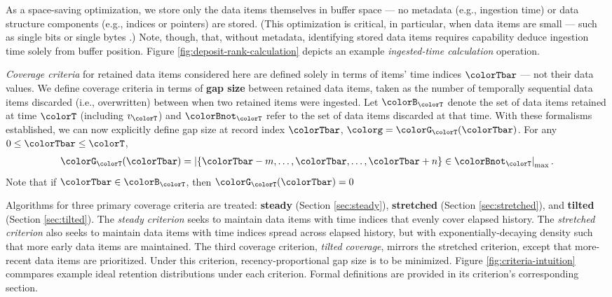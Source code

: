 As a space-saving optimization, we store only the data items themselves in buffer space --- no metadata (e.g., ingestion time) or data structure components (e.g., indices or pointers) are stored.
(This optimization is critical, in particular, when data items are small --- such as single bits or single bytes \citep{moreno2022hereditary}.)
Note, though, that, without metadata, identifying stored data items requires capability deduce ingestion time solely from buffer position.
Figure \ref{fig:deposit-rank-calculation} depicts an example \textit{ingested-time calculation} operation.

\textit{Coverage criteria} for retained data items considered here are defined solely in terms of items' time indices $\colorTbar$ --- not their data values.
We define coverage criteria in terms of \textbf{gap size} between retained data items, taken as the number of temporally sequential data items discarded (i.e., overwritten) between when two retained items were ingested.
Let $\colorB_{\colorT}$ denote the set of data items retained at time $\colorT$ (including $v_{\colorT}$) and $\colorBnot_{\colorT}$ refer to the set of data items discarded at that time.
With these formalisms established, we can now explicitly define gap size at record index $\colorTbar$, $\colorg = \colorG_{\colorT}(\colorTbar)$.
For any $0 \leq \colorTbar \leq \colorT$,
\begin{align*}
\colorG_{\colorT}(\colorTbar) = \left| \{\colorTbar - m, \ldots, \colorTbar, \ldots, \colorTbar+n\} \in \colorBnot_{\colorT} \right|_\mathrm{max}.
\end{align*}
Note that if $\colorTbar \in \colorB_{\colorT}$, then $\colorG_{\colorT}(\colorTbar) = 0$

Algorithms for three primary coverage criteria are treated: \textbf{steady} (Section \ref{sec:steady}), \textbf{stretched} (Section \ref{sec:stretched}), and \textbf{tilted} (Section \ref{sec:tilted}).
The \textit{steady criterion} seeks to maintain data items with time indices that evenly cover elapsed history.
The \textit{stretched criterion} also seeks to maintain data items with time indices spread across elapsed history, but with exponentially-decaying density such that more early data items are maintained.
The third coverage criterion, \textit{tilted coverage}, mirrors the stretched criterion, except that more-recent data items are prioritized.
Under this criterion, recency-proportional gap size is to be minimized.
Figure \ref{fig:criteria-intuition} commpares example ideal retention distributions under each criterion.
Formal definitions are provided in its criterion's corresponding section.

